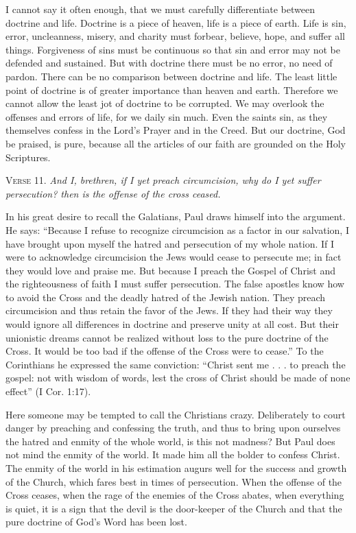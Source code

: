 I cannot say it often enough, that we must carefully differentiate between doctrine and life. Doctrine is a piece of heaven, life is a piece of earth. Life is sin, error, uncleanness, misery, and charity must forbear, believe, hope, and suffer all things. Forgiveness of sins must be continuous so that sin and error may not be defended and sustained. But with doctrine there must be no error, no need of pardon. There can be no comparison between doctrine and life. The least little point of doctrine is of greater importance than heaven and earth. Therefore we cannot allow the least jot of doctrine to be corrupted. We may overlook the offenses and errors of life, for we daily sin much. Even the saints sin, as they themselves confess in the Lord’s Prayer and in the Creed. But our doctrine, God be praised, is pure, because all the articles of our faith are grounded on the Holy Scriptures.

\textsc{Verse} 11. \emph{And I, brethren, if I yet preach circumcision, why do I yet suffer persecution? then is the offense of the cross ceased.}

In his great desire to recall the Galatians, Paul draws himself into the argument. He says: “Because I refuse to recognize circumcision as a factor in our salvation, I have brought upon myself the hatred and persecution of my whole nation. If I were to acknowledge circumcision the Jews would cease to persecute me; in fact they would love and praise me. But because I preach the Gospel of Christ and the righteousness of faith I must suffer persecution. The false apostles know how to avoid the Cross and the deadly hatred of the Jewish nation. They preach circumcision and thus retain the favor of the Jews. If they had their way they would ignore all differences in doctrine and preserve unity at all cost. But their unionistic dreams cannot be realized without loss to the pure doctrine of the Cross. It would be too bad if the offense of the Cross were to cease.” To the Corinthians he expressed the same conviction: “Christ sent me . . . to preach the gospel: not with wisdom of words, lest the cross of Christ should be made of none effect” (I Cor. 1:17).

Here someone may be tempted to call the Christians crazy. Deliberately to court danger by preaching and confessing the truth, and thus to bring upon ourselves the hatred and enmity of the whole world, is this not madness? But Paul does not mind the enmity of the world. It made him all the bolder to confess Christ. The enmity of the world in his estimation augurs well for the success and growth of the Church, which fares best in times of persecution. When the offense of the Cross ceases, when the rage of the enemies of the Cross abates, when everything is quiet, it is a sign that the devil is the door-keeper of the Church and that the pure doctrine of God’s Word has been lost.

